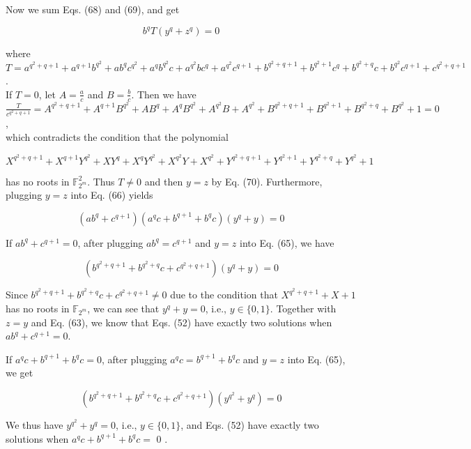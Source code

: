 \documentclass[10pt]{article}
\begin{document}
Now we sum Eqs. (68) and (69), and get


\begin{equation*}
b^{q} T\left(y^{q}+z^{q}\right)=0 \tag{70}
\end{equation*}


where\\
$T=a^{q^{2}+q+1}+a^{q+1} b^{q^{2}}+a b^{q} c^{q^{2}}+a^{q} b^{q^{2}} c+a^{q^{2}} b c^{q}+a^{q^{2}} c^{q+1}+b^{q^{2}+q+1}+b^{q^{2}+1} c^{q}+b^{q^{2}+q} c+b^{q^{2}} c^{q+1}+c^{q^{2}+q+1}$.\\
If $T=0$, let $A=\frac{a}{c}$ and $B=\frac{b}{c}$. Then we have\\
$\frac{T}{c^{q^{2}+q+1}}=A^{q^{2}+q+1}+A^{q+1} B^{q^{2}}+A B^{q}+A^{q} B^{q^{2}}+A^{q^{2}} B+A^{q^{2}}+B^{q^{2}+q+1}+B^{q^{2}+1}+B^{q^{2}+q}+B^{q^{2}}+1=0$,\\
which contradicts the condition that the polynomial

$$
X^{q^{2}+q+1}+X^{q+1} Y^{q^{2}}+X Y^{q}+X^{q} Y^{q^{2}}+X^{q^{2}} Y+X^{q^{2}}+Y^{q^{2}+q+1}+Y^{q^{2}+1}+Y^{q^{2}+q}+Y^{q^{2}}+1
$$

has no roots in $\mathbb{F}_{2^{m}}^{2}$. Thus $T \neq 0$ and then $y=z$ by Eq. (70). Furthermore, plugging $y=z$ into Eq. (66) yields


\begin{equation*}
\left(a b^{q}+c^{q+1}\right)\left(a^{q} c+b^{q+1}+b^{q} c\right)\left(y^{q}+y\right)=0 \tag{71}
\end{equation*}


If $a b^{q}+c^{q+1}=0$, after plugging $a b^{q}=c^{q+1}$ and $y=z$ into Eq. (65), we have

$$
\left(b^{q^{2}+q+1}+b^{q^{2}+q} c+c^{q^{2}+q+1}\right)\left(y^{q}+y\right)=0
$$

Since $b^{q^{2}+q+1}+b^{q^{2}+q} c+c^{q^{2}+q+1} \neq 0$ due to the condition that $X^{q^{2}+q+1}+X+1$ has no roots in $\mathbb{F}_{2^{m}}$, we can see that $y^{q}+y=0$, i.e., $y \in\{0,1\}$. Together with $z=y$ and Eq. (63), we know that Eqs. (52) have exactly two solutions when $a b^{q}+c^{q+1}=0$.

If $a^{q} c+b^{q+1}+b^{q} c=0$, after plugging $a^{q} c=b^{q+1}+b^{q} c$ and $y=z$ into Eq. (65), we get

$$
\left(b^{q^{2}+q+1}+b^{q^{2}+q} c+c^{q^{2}+q+1}\right)\left(y^{q^{2}}+y^{q}\right)=0
$$

We thus have $y^{q^{2}}+y^{q}=0$, i.e., $y \in\{0,1\}$, and Eqs. (52) have exactly two solutions when $a^{q} c+b^{q+1}+b^{q} c=$ 0 .
\end{document}
